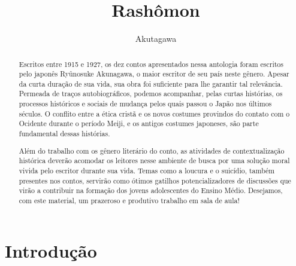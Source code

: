 \documentclass[12pt]{extarticle}
\begin{document}
\newcommand{\AutorLivro}{Akutagawa}
\newcommand{\TituloLivro}{Rashômon}
\newcommand{\Tema}{Ficção, mistério e fantasia}
\newcommand{\Genero}{Conto, crônica e novela}
\newcommand{\imagemCapa}{./images/PNLD0009-01.png}
\newcommand{\issnppub}{---}
\newcommand{\issnepub}{---}
\newcommand{\colaborador}{\textbf{Cesar Augusto Araujo Oyakawa, Bruno Gradella e Vicente Castro} é uma pessoa incrível e vai fazer um bom serviço.}


\title{\TituloLivro}
\author{\AutorLivro}
\def\authornotes{\colaborador}

\date{}
\maketitle

\baselineskip\par

\begin{abstract}
Escritos entre 1915 e 1927, os dez contos apresentados nessa antologia foram escritos 
pelo japonês Ryûnosuke Akunagawa, o maior escritor de seu país neste gênero. Apesar 
da curta duração de sua vida, sua obra foi suficiente para lhe garantir tal 
relevância. Permeada de traços autobiográficos, podemos acompanhar, pelas 
curtas histórias, os processos históricos e sociais de mudança pelos quais 
passou o Japão nos últimos séculos. O conflito entre a ética cristã e os 
novos costumes provindos do contato com o Ocidente durante o período Meiji, 
e os antigos costumes japoneses, são parte fundamental dessas histórias. 

Além do trabalho com os gênero literário do conto, as atividades de 
contextualização histórica deverão acomodar os leitores nesse ambiente de 
busca por uma solução moral vivida pelo escritor durante sua vida. 
Temas como a loucura e o suicídio, também presentes nos contos, servirão 
como ótimos gatilhos potencializadores de discussões que virão a contribuir 
na formação dos jovens adolescentes do Ensino Médio. 
Desejamos, com este material, um prazeroso e produtivo trabalho em sala de aula!

\end{abstract}

\tableofcontents

\section{Introdução}
\end{document}
